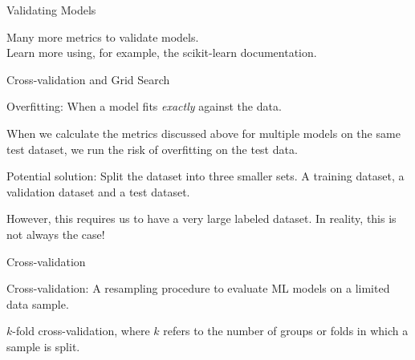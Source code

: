 \documentclass[handout]{beamer}
\begin{document}
\begin{frame}{Validating Models}
	
	Many more metrics to validate models. \\
	
	Learn more using, for example, the scikit-learn documentation. 
	
\end{frame}


\begin{frame}{Cross-validation and Grid Search}
	
	Overfitting: When a model fits \emph{exactly} against the data.
	
	When we calculate the metrics discussed above for multiple models on the same test dataset, we run the risk of overfitting on the test data.
	
	Potential solution: Split the dataset into three smaller sets. A training dataset, a validation dataset and a test dataset.
	
	However, this requires us to have a very large labeled dataset. In reality, this is not always the case!
	
	
	
\end{frame}


\begin{frame}{Cross-validation}
	
	Cross-validation: A resampling procedure to evaluate ML models on a limited data sample.
	
	\(k\)-fold cross-validation, where \(k\) refers to the number of groups or folds in which a sample is split.

\end{frame}
\end{document}
